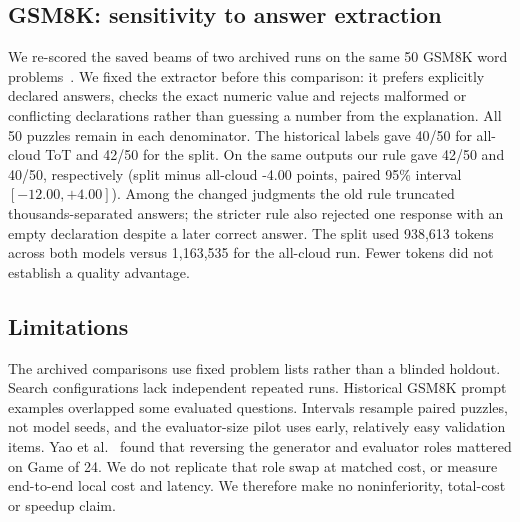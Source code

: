 \subsection{GSM8K: sensitivity to answer extraction}
We re-scored the saved beams of two archived runs on the same 50 GSM8K word problems~\cite{cobbe2021gsm8k}. We fixed the extractor before this comparison: it prefers explicitly declared answers, checks the exact numeric value and rejects malformed or conflicting declarations rather than guessing a number from the explanation. All 50 puzzles remain in each denominator. The historical labels gave 40/50 for all-cloud ToT and 42/50 for the split. On the same outputs our rule gave 42/50 and 40/50, respectively (split minus all-cloud -4.00 points, paired 95\% interval $[-12.00, +4.00]$). Among the changed judgments the old rule truncated thousands-separated answers; the stricter rule also rejected one response with an empty declaration despite a later correct answer. The split used 938,613 tokens across both models versus 1,163,535 for the all-cloud run. Fewer tokens did not establish a quality advantage.

\subsection{Limitations}
The archived comparisons use fixed problem lists rather than a blinded holdout. Search configurations lack independent repeated runs. Historical GSM8K prompt examples overlapped some evaluated questions. Intervals resample paired puzzles, not model seeds, and the evaluator-size pilot uses early, relatively easy validation items. Yao et al.~\cite[App.~B.2]{yao2023tree} found that reversing the generator and evaluator roles mattered on Game of 24. We do not replicate that role swap at matched cost, or measure end-to-end local cost and latency. We therefore make no noninferiority, total-cost or speedup claim.
